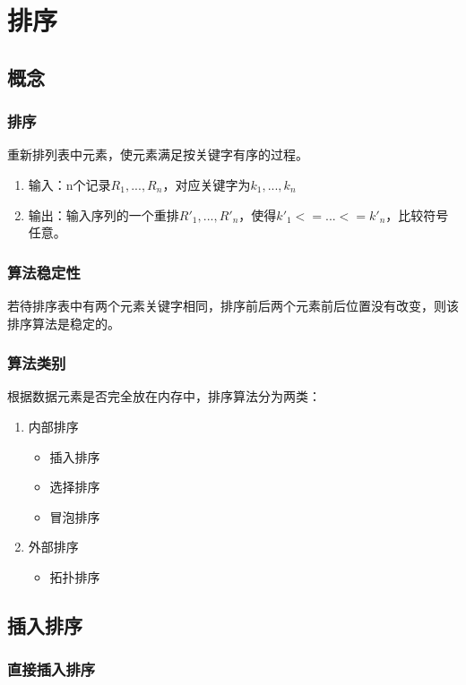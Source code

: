 
\chapter{排序}

\section{概念}

\subsection{排序}
重新排列表中元素，使元素满足按关键字有序的过程。
\begin{enumerate}
    \item 输入：n个记录\(R_1, ..., R_n\)，对应关键字为\(k_1, ..., k_n\)
    \item 输出：输入序列的一个重排\(R'_1, ..., R'_n\)，使得\(k'_1 <= ... <= k'_n\)，比较符号任意。
\end{enumerate}


\subsection{算法稳定性}
若待排序表中有两个元素关键字相同，排序前后两个元素前后位置没有改变，则该排序算法是稳定的。


\subsection{算法类别}
根据数据元素是否完全放在内存中，排序算法分为两类：
\begin{enumerate}
    \item 内部排序\begin{itemize}
        \item 插入排序
        \item 选择排序
        \item 冒泡排序
    \end{itemize}
    \item 外部排序\begin{itemize}
        \item 拓扑排序
    \end{itemize}
\end{enumerate}


\section{插入排序}

\subsection{直接插入排序}

